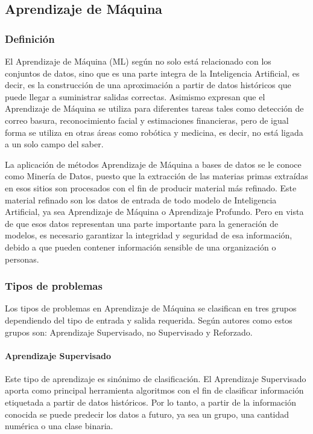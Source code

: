 \subsection{Aprendizaje de Máquina}
\subsubsection{Definición}
El Aprendizaje de Máquina (ML) según \textcite{Ethem2014} no solo está relacionado con los conjuntos de datos, sino que es una parte integra de la Inteligencia Artificial, es decir, es la construcción de una aproximación a partir de datos históricos que puede llegar a suministrar salidas correctas. Asimismo \textcite{Bost2015} expresan que el Aprendizaje de Máquina se utiliza para diferentes tareas tales como detección de correo basura, reconocimiento facial y estimaciones financieras, pero de igual forma se utiliza en otras áreas como robótica y medicina, es decir, no está ligada a un solo campo del saber.

La aplicación de métodos Aprendizaje de Máquina a bases de datos se le conoce como Minería de Datos, puesto que la extracción de las materias primas extraídas en esos sitios son procesados con el fin de producir material más refinado. Este material refinado son los datos de entrada de todo modelo de Inteligencia Artificial, ya sea Aprendizaje de Máquina o Aprendizaje Profundo. Pero en vista de que esos datos representan una parte importante para la generación de modelos, es necesario garantizar la integridad y seguridad de esa información, debido a que pueden contener información sensible de una organización o personas.

\subsubsection{Tipos de problemas}
Los tipos de problemas en Aprendizaje de Máquina se clasifican en tres grupos dependiendo del tipo de entrada y salida requerida. Según autores como \textcite{Russell2003, Han2012, raschka2015python} estos grupos son: Aprendizaje Supervisado, no Supervisado y Reforzado.

\paragraph{Aprendizaje Supervisado} Este tipo de aprendizaje es sinónimo de clasificación. El Aprendizaje Supervisado aporta como principal herramienta algoritmos con el fin de clasificar información etiquetada a partir de datos históricos. Por lo tanto, a partir de la información conocida se puede predecir los datos a futuro, ya sea un grupo, una cantidad numérica o una clase binaria.


